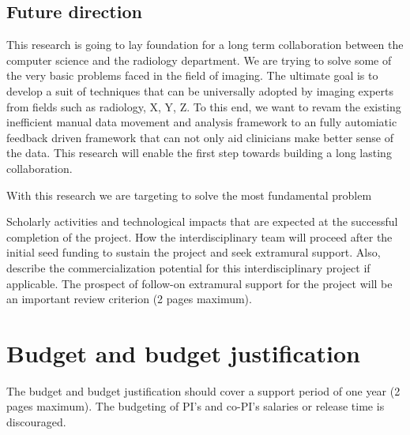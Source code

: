 \documentclass[11pt]{article}
\begin{document}
\subsection{Future direction}
This research is going to lay foundation for a long term collaboration between the computer science and the radiology department. We are trying to solve some of the very basic problems faced in the field of imaging. The ultimate goal is to develop a suit of techniques that can be universally adopted by imaging experts from fields such as radiology, X, Y, Z. To this end, we want to revam the existing inefficient manual data movement and analysis framework to an fully automiatic feedback driven framework that can not only aid clinicians make better sense of the data. This research will enable the first step towards building a long lasting collaboration.

With this research we are targeting to solve the most fundamental problem

Scholarly activities and technological impacts that are
expected at the successful completion of the project. How the interdisciplinary
team will proceed after the initial seed funding to sustain the project and seek
extramural support. Also, describe the commercialization potential for this
interdisciplinary project if applicable. The prospect of follow-on extramural
support for the project will be an important review criterion (2 pages maximum).

\section{Budget and budget justification}
The budget and budget justification should cover a support period of one year (2 pages maximum). The budgeting of PI’s and co-PI’s salaries or release time is discouraged.  
\end{document}
